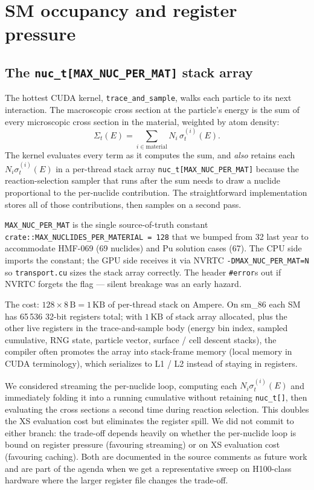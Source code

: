\section{SM occupancy and register pressure}
\label{sec:sm_occupancy}

\subsection{The \texttt{nuc\_t[MAX\_NUC\_PER\_MAT]} stack array}

The hottest CUDA kernel, \texttt{trace\_and\_sample}, walks each
particle to its next interaction. The macroscopic cross section
at the particle's energy is the sum of every microscopic cross
section in the material, weighted by atom density:
\[
\Sigma_t(E)
= \sum_{i \in \text{material}} N_i \,\sigma_t^{(i)}(E).
\]
The kernel evaluates every term as it computes the sum, and
\emph{also} retains each $N_i \sigma_t^{(i)}(E)$ in a per-thread
stack array \texttt{nuc\_t[MAX\_NUC\_PER\_MAT]} because the
reaction-selection sampler that runs after the sum needs to draw a
nuclide proportional to the per-nuclide contribution. The
straightforward implementation stores all of those contributions,
then samples on a second pass.

\texttt{MAX\_NUC\_PER\_MAT} is the single source-of-truth constant
\texttt{crate::MAX\_NUCLIDES\_PER\_MATERIAL = 128} that we bumped
from 32 last year to accommodate HMF-069 (69 nuclides) and Pu
solution cases (67). The CPU side imports the constant; the GPU
side receives it via NVRTC \texttt{-DMAX\_NUC\_PER\_MAT=N} so
\texttt{transport.cu} sizes the stack array correctly. The header
\texttt{\#error}s out if NVRTC forgets the flag --- silent
breakage was an early hazard.

The cost: $128 \times 8\,\text{B} = 1\,\text{KB}$ of per-thread
stack on Ampere. On sm\_86 each SM has 65\,536 32-bit registers
total; with $1\,\text{KB}$ of stack array allocated, plus the
other live registers in the trace-and-sample body (energy bin
index, sampled cumulative, RNG state, particle vector, surface /
cell descent stacks), the compiler often promotes the array
into stack-frame memory (local memory in CUDA terminology), which
serializes to L1 / L2 instead of staying in registers.

We considered streaming the per-nuclide loop, computing each
$N_i \sigma_t^{(i)}(E)$ and immediately folding it into a running
cumulative without retaining \texttt{nuc\_t[]}, then evaluating
the cross sections a second time during reaction selection. This
doubles the XS evaluation cost but eliminates the register
spill. We did not commit to either branch: the trade-off depends
heavily on whether the per-nuclide loop is bound on register
pressure (favouring streaming) or on XS evaluation cost
(favouring caching). Both are documented in the source comments
as future work and are part of the agenda when we get a
representative sweep on H100-class hardware where the larger
register file changes the trade-off.

